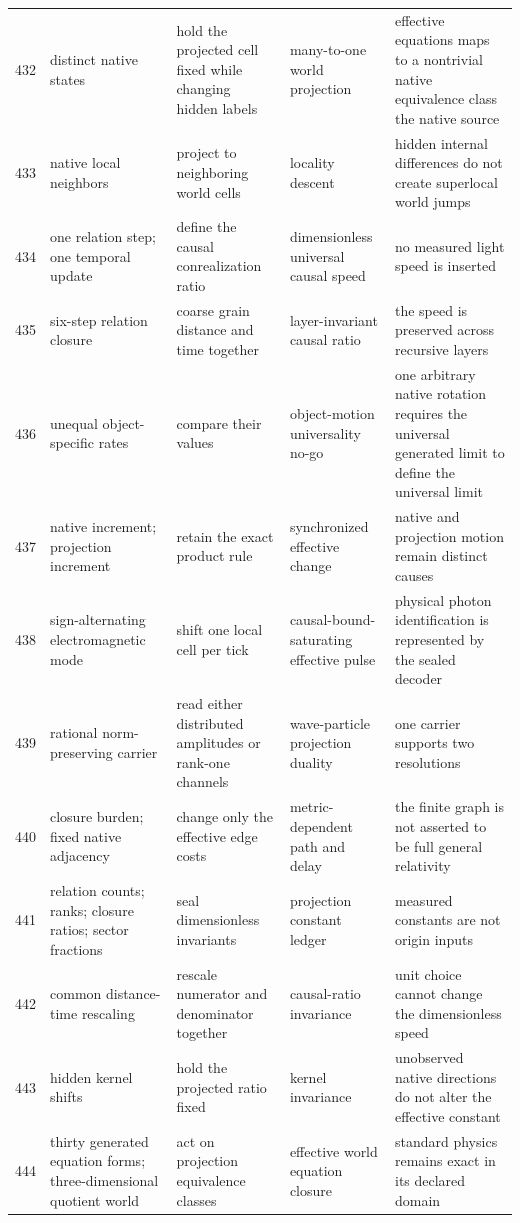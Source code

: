 \documentclass[11pt]{article}
\numberwithin{equation}{section}
\theoremstyle{remark}
\begin{document}
\begin{landscape}
\begin{longtable}{p{0.65cm}p{3.5cm}p{4.0cm}p{4.0cm}p{4.6cm}}
432&distinct native states&hold the projected cell fixed while changing hidden labels&many-to-one world projection&effective equations maps to a nontrivial native equivalence class the native source\\
433&native local neighbors&project to neighboring world cells&locality descent&hidden internal differences do not create superlocal world jumps\\
434&one relation step; one temporal update&define the causal conrealization ratio&dimensionless universal causal speed&no measured light speed is inserted\\
435&six-step relation closure&coarse grain distance and time together&layer-invariant causal ratio&the speed is preserved across recursive layers\\
436&unequal object-specific rates&compare their values&object-motion universality no-go&one arbitrary native rotation requires the universal generated limit to define the universal limit\\
437&native increment; projection increment&retain the exact product rule&synchronized effective change&native and projection motion remain distinct causes\\
438&sign-alternating electromagnetic mode&shift one local cell per tick&causal-bound-saturating effective pulse&physical photon identification is represented by the sealed decoder\\
439&rational norm-preserving carrier&read either distributed amplitudes or rank-one channels&wave-particle projection duality&one carrier supports two resolutions\\
440&closure burden; fixed native adjacency&change only the effective edge costs&metric-dependent path and delay&the finite graph is not asserted to be full general relativity\\
441&relation counts; ranks; closure ratios; sector fractions&seal dimensionless invariants&projection constant ledger&measured constants are not origin inputs\\
442&common distance-time rescaling&rescale numerator and denominator together&causal-ratio invariance&unit choice cannot change the dimensionless speed\\
443&hidden kernel shifts&hold the projected ratio fixed&kernel invariance&unobserved native directions do not alter the effective constant\\
444&thirty generated equation forms; three-dimensional quotient world&act on projection equivalence classes&effective world equation closure&standard physics remains exact in its declared domain\\

\end{longtable}
\end{landscape}
\end{document}

